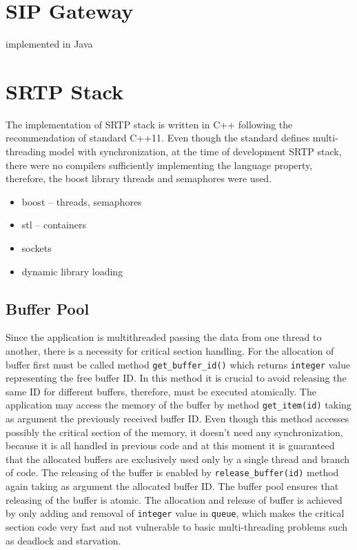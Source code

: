 
\section{SIP Gateway}
implemented in Java


\section{SRTP Stack}
The implementation of SRTP stack is written in C++ following the recommendation
of standard C++11. Even though the standard defines multi-threading model with
synchronization, at the time of development SRTP stack, there were no compilers
sufficiently implementing the language property, therefore, the boost library
threads and semaphores were used. 

\begin{itemize}
\item boost -- threads, semaphores
\item stl -- containers
\item sockets
\item dynamic library loading
\end{itemize}

\subsection{Buffer Pool}
Since the application is multithreaded passing the data from one thread to 
another, there is a necessity for critical section handling. For the allocation
of buffer first must be called method \texttt{get\_buffer\_id()} which returns
\texttt{integer} value representing the free buffer ID. In this method it is 
crucial to avoid releasing the same ID for different buffers, therefore, must
be executed atomically. The application may access the memory of the buffer
by method \texttt{get\_item(id)} taking as argument the previously received 
buffer ID. Even though this method accesses possibly the critical section of
the memory, it doesn't need any synchronization, because it is all handled in 
previous code and at this moment it is guaranteed that the allocated buffers
are exclusively used only by a single thread and branch of code. The releasing
of the buffer is enabled by \texttt{release\_buffer(id)} method again taking as
argument the allocated buffer ID. The buffer pool ensures that releasing of
the buffer is atomic. The allocation and release of buffer is achieved by
only adding and removal of \texttt{integer} value in \texttt{queue}, which
makes the critical section code very fast and not vulnerable to basic 
multi-threading problems such as deadlock and starvation.

